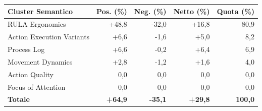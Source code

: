 \begin{tabular*}{\linewidth}{@{}l@{\extracolsep{\fill}}rrrr@{}}
\toprule
\textbf{Cluster Semantico} & \textbf{Pos. (\%)} & \textbf{Neg. (\%)} & \textbf{Netto (\%)} & \textbf{Quota (\%)} \\
\midrule
RULA Ergonomics & +48{,}8 & -32{,}0 & +16{,}8 & 80{,}9 \\
Action Execution Variants & +6{,}6 & -1{,}6 & +5{,}0 & 8{,}2 \\
Process Log & +6{,}6 & -0{,}2 & +6{,}4 & 6{,}9 \\
Movement Dynamics & +2{,}8 & -1{,}2 & +1{,}6 & 4{,}0 \\
Action Quality & 0{,}0 & 0{,}0 & 0{,}0 & 0{,}0 \\
Focus of Attention & 0{,}0 & 0{,}0 & 0{,}0 & 0{,}0 \\
\midrule
\textbf{Totale} & \textbf{+64{,}9} & \textbf{-35{,}1} & \textbf{+29{,}8} & \textbf{100{,}0} \\
\bottomrule
\end{tabular*}
